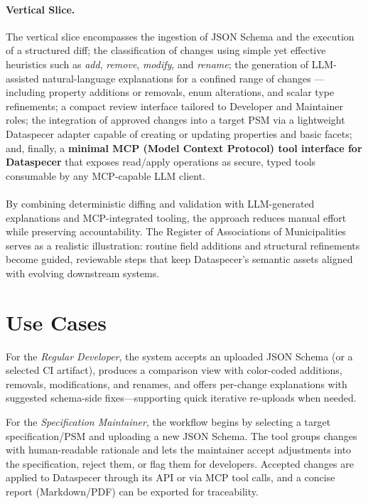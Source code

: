 \paragraph{Vertical Slice.}
The vertical slice encompasses the ingestion of JSON Schema and the execution of a structured diff; the classification of changes using simple yet effective heuristics such as \emph{add}, \emph{remove}, \emph{modify}, and \emph{rename}; the generation of LLM-assisted natural-language explanations for a confined range of changes — including property additions or removals, enum alterations, and scalar type refinements; a compact review interface tailored to Developer and Maintainer roles; the integration of approved changes into a target PSM via a lightweight Dataspecer adapter capable of creating or updating properties and basic facets; and, finally, a \textbf{minimal MCP (Model Context Protocol) tool interface for Dataspecer} that exposes read/apply operations as secure, typed tools consumable by any MCP-capable LLM client.\\
\\

By combining deterministic diffing and validation with LLM-generated explanations and MCP-integrated tooling, the approach reduces manual effort while preserving accountability. The Register of Associations of Municipalities serves as a realistic illustration: routine field additions and structural refinements become guided, reviewable steps that keep Dataspecer’s semantic assets aligned with evolving downstream systems.

\section{Use Cases}
For the \textit{Regular Developer}, the system accepts an uploaded JSON Schema (or a selected CI artifact), produces a comparison view with color-coded additions, removals, modifications, and renames, and offers per-change explanations with suggested schema-side fixes—supporting quick iterative re-uploads when needed.

For the \textit{Specification Maintainer}, the workflow begins by selecting a target specification/PSM and uploading a new JSON Schema. The tool groups changes with human-readable rationale and lets the maintainer accept adjustments into the specification, reject them, or flag them for developers. Accepted changes are applied to Dataspecer through its API or via MCP tool calls, and a concise report (Markdown/PDF) can be exported for traceability.

